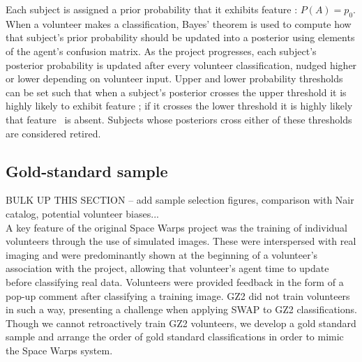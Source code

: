 Each subject is assigned a prior probability that it exhibits feature \A: $P(A) = p_0$. 
When a volunteer makes a classification, Bayes' theorem is used to compute how 
that subject's prior probability should be updated into a posterior using elements
of the agent's confusion matrix. 
As the project progresses, each subject's posterior probability is updated after every volunteer classification,
 nudged higher or lower depending on volunteer input. 
Upper and lower probability thresholds can be set such that when a subject's posterior crosses the upper threshold it is highly likely to exhibit feature \A; if it crosses the lower threshold it is highly likely that feature \A~is absent. Subjects whose posteriors cross either of these thresholds are considered retired.


\subsection{Gold-standard sample}\label{sec: training sample}

BULK UP THIS SECTION -- add sample selection figures, comparison with Nair catalog, potential volunteer biases...\\

A key feature of the original Space Warps project was the training of 
individual volunteers through the use of simulated images.
These were interspersed with real imaging and were 
predominantly shown at the beginning of a volunteer's association with the project, 
allowing that volunteer's agent time to update before classifying real data. 
Volunteers were provided feedback in the form of a pop-up comment after
classifying a training image. GZ2 did not train volunteers in such a way, presenting
 a challenge when applying SWAP to GZ2 classifications. Though we cannot retroactively train GZ2 volunteers, we develop a gold standard sample and arrange the order of gold standard classifications in order to mimic the Space Warps system.


